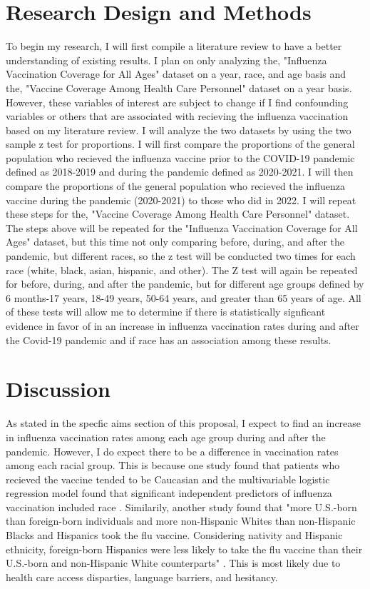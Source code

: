 \documentclass[12pt]{article}
\begin{document}
\section*{Research Design and Methods}
\label{sec:design}
To begin my research, I will first compile a literature review to have a better understanding of existing results. I plan on only analyzing the, 
"Influenza Vaccination Coverage for All Ages" dataset on a year, race, and age basis and the, "Vaccine Coverage Among Health Care Personnel" 
dataset on a year basis. However, these variables of interest are subject to change if I find confounding variables or others that
are associated with recieving the influenza vaccination based on my literature review. I will analyze the two datasets by using the two sample z 
test for proportions. I will first compare the proportions of the general population who recieved the influenza vaccine prior to the COVID-19 
pandemic defined as 2018-2019 and during the pandemic defined as 2020-2021. I will then compare the proportions of the general population who
recieved the influenza vaccine during the pandemic (2020-2021) to those who did in 2022. I will repeat these steps for the, "Vaccine Coverage Among 
Health Care Personnel" dataset. The steps above will be repeated for the "Influenza Vaccination Coverage for All Ages" dataset, but this time not only
comparing before, during, and after the pandemic, but different races, so the z test will be conducted two times for each race (white, black, asian,
hispanic, and other). The Z test will again be repeated for before, during, and after the pandemic, but for different age groups defined by 6 months-17 years, 
18-49 years, 50-64 years, and greater than 65 years of age. All of these tests will allow me to determine if there is statistically signficant evidence in favor
of in an increase in influenza vaccination rates during and after the Covid-19 pandemic and if race has an association among these results.

\section*{Discussion}
\label{sec:discussion}
As stated in the specfic aims section of this proposal, I expect to find an increase in influenza vaccination rates among each age group during and after the 
pandemic. However, I do expect there to be a difference in vaccination rates among each racial group. This is because one study found that patients who recieved 
the vaccine tended to be Caucasian and  the multivariable logistic regression model found that significant independent predictors
of influenza vaccination included race \citep{conlon2021impact}. Similarily, another study found that "more U.S.-born than foreign-born individuals and more 
non-Hispanic Whites than non-Hispanic Blacks and Hispanics took the flu vaccine. Considering nativity and Hispanic ethnicity, foreign-born Hispanics were less 
likely to take the flu vaccine than their U.S.-born and non-Hispanic White counterparts" \citep{jang2021factors}. This is most likely due to health care access 
disparties, language barriers, and hesitancy. 
\end{document}

